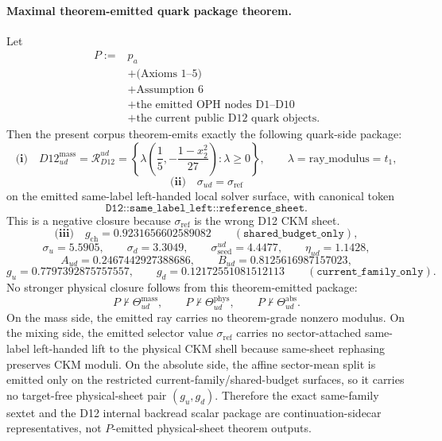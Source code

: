 \documentclass[11pt]{article}
\begin{document}
\paragraph{Maximal theorem-emitted quark package theorem.}
Let
\[
\begin{aligned}
P:={}&p_a\\
&+\text{(Axioms 1--5)}\\
&+\text{Assumption 6}\\
&+\text{the emitted OPH nodes D1--D10}\\
&+\text{the current public D12 quark objects}.
\end{aligned}
\]
Then the present corpus theorem-emits exactly the following quark-side package:
\[
\textbf{(i)}\quad
D12_{ud}^{\mathrm{mass}}
=
\mathcal R_{D12}^{ud}
=
\left\{
\lambda\left(\frac15,-\frac{1-x_2^2}{27}\right):\lambda\ge0
\right\},
\qquad
\lambda=\mathrm{ray\_modulus}=t_1,
\]
\[
\textbf{(ii)}\quad
\sigma_{ud}=\sigma_{\mathrm{ref}}
\]
on the emitted same-label left-handed local solver surface, with canonical token
\[
\texttt{D12::same\_label\_left::reference\_sheet}.
\]
This is a negative closure because \(\sigma_{\mathrm{ref}}\) is the wrong D12 CKM sheet.
\[
\textbf{(iii)}\quad
g_{\mathrm{ch}}=0.9231656602589082
\qquad
(\texttt{shared\_budget\_only}),
\]
\[
\sigma_u=5.5905,\qquad
\sigma_d=3.3049,\qquad
\sigma_{\mathrm{seed}}^{ud}=4.4477,\qquad
\eta_{ud}=1.1428,
\]
\[
A_{ud}=0.2467442927388686,
\qquad
B_{ud}=0.8125616987157023,
\]
\[
g_u=0.7797392875757557,
\qquad
g_d=0.12172551081512113
\qquad
(\texttt{current\_family\_only}).
\]
No stronger physical closure follows from this theorem-emitted package:
\[
P\nvdash
\Theta_{ud}^{\mathrm{mass}},
\qquad
P\nvdash
\Theta_{ud}^{\mathrm{phys}},
\qquad
P\nvdash
\Theta_{ud}^{\mathrm{abs}}.
\]
On the mass side, the emitted ray carries no theorem-grade nonzero modulus. On the mixing side, the emitted selector value \(\sigma_{\mathrm{ref}}\) carries no sector-attached same-label left-handed lift to the physical CKM shell because same-sheet rephasing preserves CKM moduli. On the absolute side, the affine sector-mean split is emitted only on the restricted current-family/shared-budget surfaces, so it carries no target-free physical-sheet pair \((g_u,g_d)\). Therefore the exact same-family sextet and the D12 internal backread scalar package are continuation-sidecar representatives, not \(P\)-emitted physical-sheet theorem outputs.
\end{document}

